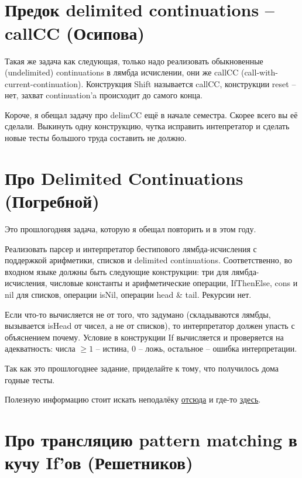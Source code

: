 \documentclass[a4paper,14pt]{article}
\begin{document}
\section{$\qquad$}




\section{Предок delimited continuations -- callCC (Осипова)}

Такая же задача как следующая, только надо реализовать обыкновенные (undelimited) continuations в лямбда исчислении, они же callCC (call-with-current-continuation). Конструкция Shift называется callCC, конструкции reset -- нет, захват continuation'a происходит до самого конца.

Короче, я обещал задачу про delimCC ещё в начале семестра. Скорее всего вы её сделали. Выкинуть одну конструкцию, чутка исправить интепретатор и сделать новые тесты большого труда составить не должно.

\section{Про Delimited Continuations (Погребной)}

Это прошлогодняя задача, которую я обещал повторить и в этом году.

Реализовать парсер и интерпретатор бестипового лямбда-исчисления с поддержкой арифметики, списков и delimited continuations. Соответственно, во входном языке должны быть следующие конструкции: три для лямбда-исчисления, числовые константы и арифметические операции, IfThenElse, cons и nil для списков, операции isNil, операции head \& tail. Рекурсии нет.

Если что-то вычисляется не от того, что задумано (складываются лямбды, вызывается isHead от чисел, а не от списков), то интерпретатор должен упасть с объяснением почему. Условие в конструкции If вычисляется и проверяется на адекватность: числа $\geq 1$ -- истина, $0$ -- ложь, остальное -- ошибка интерпретации.

Так как это прошлогоднее задание,  приделайте к  тому, что получилось дома годные тесты. 

Полезную информацию стоит искать неподалёку \href{http://okmij.org/ftp/continuations/index.html#tutorial}{отсюда} и где-то \href{http://pllab.is.ocha.ac.jp/~asai/cw2011tutorial/slides.pdf}{здесь}.

\section{Про трансляцию pattern matching в кучу If'ов (Решетников)}
\end{document}
